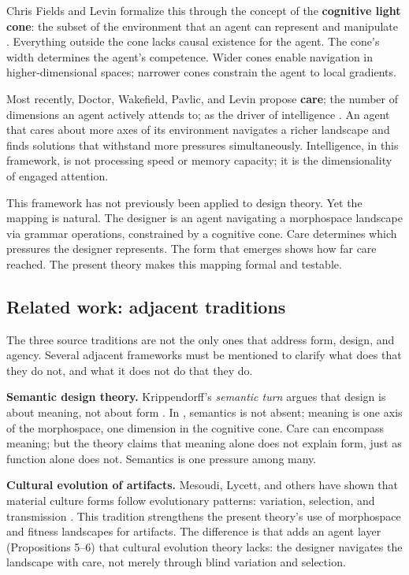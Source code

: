 Chris Fields and Levin formalize this through the concept of the \textbf{cognitive light cone}: the subset of the environment that an agent can represent and manipulate \parencite{Fields2022}. Everything outside the cone lacks causal existence for the agent. The cone's width determines the agent's competence. Wider cones enable navigation in higher-dimensional spaces; narrower cones constrain the agent to local gradients.

Most recently, Doctor, Wakefield, Pavlic, and Levin propose \textbf{care}; the number of dimensions an agent actively attends to; as the driver of intelligence \parencite{Doctor2024}. An agent that cares about more axes of its environment navigates a richer landscape and finds solutions that withstand more pressures simultaneously. Intelligence, in this framework, is not processing speed or memory capacity; it is the dimensionality of engaged attention.

This framework has not previously been applied to design theory. Yet the mapping is natural. The designer is an agent navigating a morphospace landscape via grammar operations, constrained by a cognitive cone. Care determines which pressures the designer represents. The form that emerges shows how far care reached. The present theory makes this mapping formal and testable.

\subsection{Related work: adjacent traditions}

The three source traditions are not the only ones that address form, design, and agency. Several adjacent frameworks must be mentioned to clarify what \formlaere{} does that they do not, and what it does not do that they do.

\textbf{Semantic design theory.} Krippendorff's \textit{semantic turn} argues that design is about meaning, not about form \parencite{Krippendorff2006}. In \formlaere{}, semantics is not absent; meaning is one axis of the morphospace, one dimension in the cognitive cone. Care can encompass meaning; but the theory claims that meaning alone does not explain form, just as function alone does not. Semantics is one pressure among many.

\textbf{Cultural evolution of artifacts.} Mesoudi, Lycett, and others have shown that material culture forms follow evolutionary patterns: variation, selection, and transmission \parencite{Mesoudi2011, Lycett2015}. This tradition strengthens the present theory's use of morphospace and fitness landscapes for artifacts. The difference is that \formlaere{} adds an agent layer (Propositions 5--6) that cultural evolution theory lacks: the designer navigates the landscape with care, not merely through blind variation and selection.

